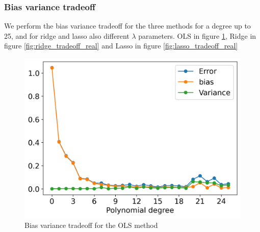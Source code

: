 \documentclass[12pt]{article}
\begin{document}
\subsubsection{Bias variance tradeoff}
We perform the bias variance tradeoff for the three methods for a degree up to 25, and for ridge and lasso also different $\lambda$ parameters. OLS in figure \ref{fig:tradeoff_real}, Ridge in figure \ref{fig:ridge_tradeoff_real} and Lasso in figure \ref{fig:lasso_tradeoff_real}
\begin{figure}[H]
  \centering
  \includegraphics[width=.5\textwidth]{../figures/ols_real_tradeoff.png}
  \caption{Bias variance tradeoff for the OLS method}
  \label{fig:tradeoff_real}
\end{figure}
\end{document}
